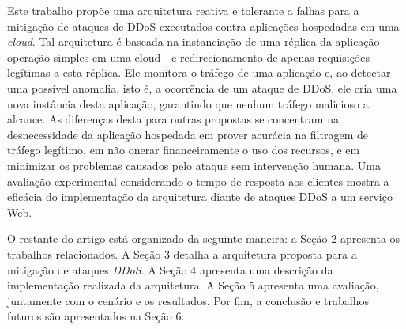 Este trabalho propõe uma arquitetura reativa e tolerante a falhas para a mitigação de ataques de DDoS executados contra aplicações hospedadas em uma \emph{cloud}. Tal arquitetura é baseada na instanciação de uma réplica da aplicação - operação simples em uma cloud - e redirecionamento de apenas requisições legítimas a esta réplica.  Ele monitora o tráfego de uma aplicação e, ao detectar uma possível anomalia, isto é, a ocorrência de um ataque de DDoS, ele cria uma nova instância desta aplicação, garantindo que nenhum tráfego malicioso a alcance. 
As diferenças desta para outras propostas se concentram na desnecessidade da aplicação hospedada em prover acurácia na filtragem de tráfego legítimo, em não onerar financeiramente o uso dos recursos, e em minimizar os problemas causados pelo ataque sem intervenção humana. 
Uma avaliação experimental considerando o tempo de resposta aos clientes %
mostra a eficácia do implementação da arquitetura diante de ataques DDoS a um serviço Web.
 

O restante do artigo está organizado da seguinte maneira: a Seção 2 apresenta os trabalhos relacionados. A Seção 3 detalha a arquitetura proposta para a mitigação de ataques \emph{DDoS}. A Seção 4 apresenta uma descrição da implementação realizada da arquitetura. A Seção 5 apresenta uma avaliação, juntamente com o cenário e os resultados. Por fim, a conclusão e trabalhos futuros são apresentados na Seção 6.
